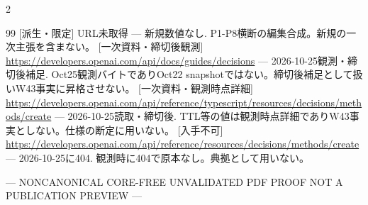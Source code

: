 \documentclass[lualatex,a4paper,10pt]{jlreq}
\begin{document}
\begin{multicols}{2}
{\begin{thebibliography}{99}
 [派生・限定] URL未取得 --- 新規数値なし. P1-P8横断の編集合成。新規の一次主張を含まない。
 [一次資料・締切後観測] \url{https://developers.openai.com/api/docs/guides/decisions} --- 2026-10-25観測・締切後補足. Oct25観測バイトでありOct22 snapshotではない。締切後補足として扱いW43事実に昇格させない。
 [一次資料・観測時点詳細] \url{https://developers.openai.com/api/reference/typescript/resources/decisions/methods/create} --- 2026-10-25読取・締切後. TTL等の値は観測時点詳細でありW43事実としない。仕様の断定に用いない。
 [入手不可] \url{https://developers.openai.com/api/reference/resources/decisions/methods/create} --- 2026-10-25に404. 観測時に404で原本なし。典拠として用いない。
\end{thebibliography}}

\end{multicols} %
\begin{center}\color{SurveyMuted}--- NONCANONICAL CORE-FREE UNVALIDATED PDF PROOF \quad NOT A PUBLICATION PREVIEW ---\end{center}
\end{document}
